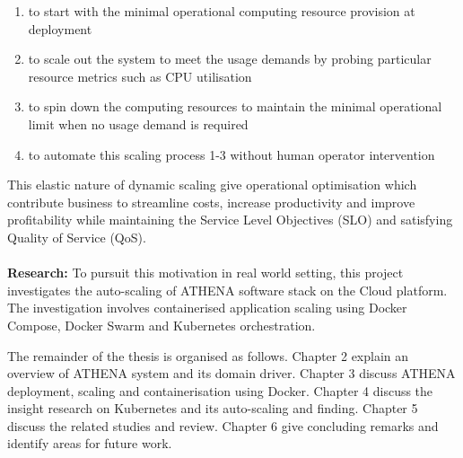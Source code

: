 \begin{enumerate}
\item to start with the minimal operational computing resource provision at deployment
\item to scale out the system to meet the usage demands by probing particular resource metrics such as CPU utilisation
\item to spin down the computing resources to maintain the minimal operational limit when no usage demand is required
\item to automate this scaling process 1-3 without human operator intervention
\end{enumerate}

This elastic nature of dynamic scaling give operational optimisation which contribute business to streamline costs, increase productivity and improve profitability while maintaining the Service Level Objectives (SLO) and satisfying Quality of Service (QoS).
\\
\\
\textbf{Research:} \quad To pursuit this motivation in real world setting, this project investigates the auto-scaling of ATHENA software stack on the Cloud platform. The investigation involves containerised application scaling using Docker Compose, Docker Swarm and Kubernetes orchestration.



The remainder of the thesis is organised as follows. Chapter 2 explain an overview of ATHENA system and its domain driver. Chapter 3 discuss ATHENA deployment, scaling and containerisation using Docker. Chapter 4 discuss the insight research on Kubernetes and its auto-scaling and finding. Chapter 5 discuss the related studies and review. Chapter 6 give concluding remarks and identify areas for future work.

